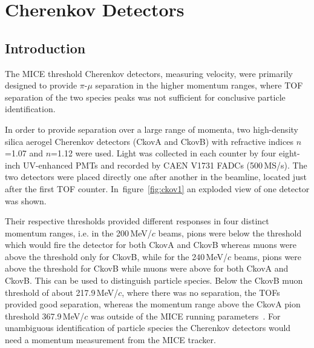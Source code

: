 \graphicspath{{03-Ckov/Figures/}}

\section{Cherenkov Detectors}
\label{Sect:Ckov}

\subsection{Introduction}
\label{SubSect:Ckov_Intro}

The MICE threshold Cherenkov detectors, measuring velocity, were primarily designed to provide $\pi$-$\mu$ separation in the higher momentum ranges, where TOF separation of the two species peaks was not sufficient for conclusive particle identification.

In order to provide separation over a large range of momenta, two high-density silica aerogel Cherenkov detectors (CkovA and CkovB) with refractive indices $n$=1.07 and $n$=1.12 were used.
Light was collected in each counter by four eight-inch UV-enhanced PMTs and recorded by CAEN V1731 FADCs (500\,MS/s).
The two detectors were placed directly one after another in the beamline, located just after the first TOF counter. In~figure~\ref{fig:ckov1} an exploded view of one detector was shown.

Their respective thresholds provided different responses in four distinct momentum ranges, i.e. in the 200\,MeV/$c$ beams, pions were below the threshold which would fire the detector for both CkovA and CkovB whereas muons were above the threshold only for CkovB, while for the 240\,MeV/$c$ beams, pions were above the threshold for CkovB while muons were above for both CkovA and CkovB.
This can be used to distinguish particle species.
Below the CkovB muon threshold of about 217.9\,MeV/$c$, where there was no separation, the TOFs provided good separation, whereas the momentum range above the CkovA pion threshold 367.9\,MeV/$c$ was outside of the MICE running parameters~\cite{NOTE473}.
For unambiguous identification of particle species the Cherenkov detectors would need a momentum measurement from the MICE tracker.

